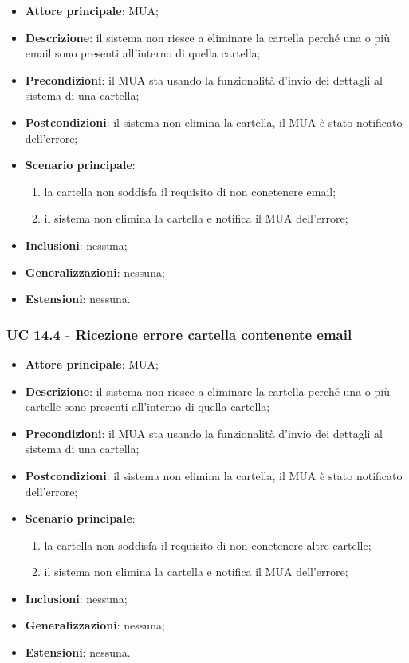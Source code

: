     \begin{itemize}
        \item \textbf{Attore principale}: MUA;
        \item \textbf{Descrizione}: il sistema non riesce a eliminare la cartella perché una o più email sono presenti all'interno di quella cartella;
        \item \textbf{Precondizioni}: il MUA sta usando la funzionalità d'invio dei dettagli al sistema di una cartella;
        \item \textbf{Postcondizioni}: il sistema non elimina la cartella, il MUA è stato notificato dell'errore;
        \item \textbf{Scenario principale}:
            \begin{enumerate}
                \item la cartella non soddisfa il requisito di non conetenere email;
                \item il sistema non elimina la cartella e notifica il MUA dell'errore;
            \end{enumerate}
        \item \textbf{Inclusioni}: nessuna;
        \item \textbf{Generalizzazioni}: nessuna;
        \item \textbf{Estensioni}: nessuna.
    \end{itemize}


    \subsubsection{UC 14.4 - Ricezione errore cartella contenente email} \label{sec:UC14.4}

    \begin{itemize}
        \item \textbf{Attore principale}: MUA;
        \item \textbf{Descrizione}: il sistema non riesce a eliminare la cartella perché una o più cartelle sono presenti all'interno di quella cartella;
        \item \textbf{Precondizioni}: il MUA sta usando la funzionalità d'invio dei dettagli al sistema di una cartella;
        \item \textbf{Postcondizioni}: il sistema non elimina la cartella, il MUA è stato notificato dell'errore;
        \item \textbf{Scenario principale}:
            \begin{enumerate}
                \item la cartella non soddisfa il requisito di non conetenere altre cartelle;
                \item il sistema non elimina la cartella e notifica il MUA dell'errore;
            \end{enumerate}
        \item \textbf{Inclusioni}: nessuna;
        \item \textbf{Generalizzazioni}: nessuna;
        \item \textbf{Estensioni}: nessuna.
    \end{itemize}

